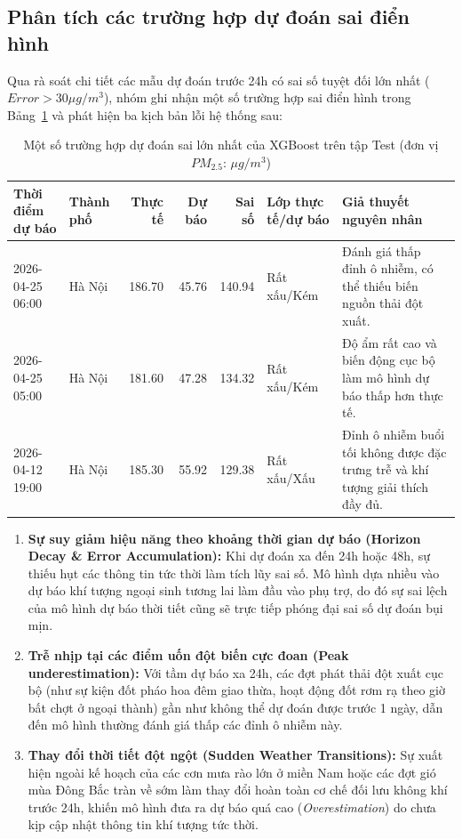 \documentclass[12pt,a4paper]{article}
\begin{document}
\subsection{Phân tích các trường hợp dự đoán sai điển hình}

Qua rà soát chi tiết các mẫu dự đoán trước 24h có sai số tuyệt đối lớn nhất ($Error > 30 \mu g/m^3$), nhóm ghi nhận một số trường hợp sai điển hình trong Bảng~\ref{tab:error-cases} và phát hiện ba kịch bản lỗi hệ thống sau:

\begin{table}[H]
    \centering
    \scriptsize
    \caption{Một số trường hợp dự đoán sai lớn nhất của XGBoost trên tập Test (đơn vị $PM_{2.5}$: $\mu g/m^3$)}
    \label{tab:error-cases}
    \begin{tabular}{p{2.4cm}p{1.3cm}rrrp{2.0cm}p{4.2cm}}
        \toprule
        \textbf{Thời điểm dự báo} & \textbf{Thành phố} & \textbf{Thực tế} & \textbf{Dự báo} & \textbf{Sai số} & \textbf{Lớp thực tế/dự báo} & \textbf{Giả thuyết nguyên nhân} \\
        \midrule
        2026-04-25 06:00 & Hà Nội & 186.70 & 45.76 & 140.94 & Rất xấu/Kém & Đánh giá thấp đỉnh ô nhiễm, có thể thiếu biến nguồn thải đột xuất. \\
        2026-04-25 05:00 & Hà Nội & 181.60 & 47.28 & 134.32 & Rất xấu/Kém & Độ ẩm rất cao và biến động cục bộ làm mô hình dự báo thấp hơn thực tế. \\
        2026-04-12 19:00 & Hà Nội & 185.30 & 55.92 & 129.38 & Rất xấu/Xấu & Đỉnh ô nhiễm buổi tối không được đặc trưng trễ và khí tượng giải thích đầy đủ. \\
        \bottomrule
    \end{tabular}
\end{table}

\begin{enumerate}
    \item \textbf{Sự suy giảm hiệu năng theo khoảng thời gian dự báo (Horizon Decay \& Error Accumulation):} Khi dự đoán xa đến 24h hoặc 48h, sự thiếu hụt các thông tin tức thời làm tích lũy sai số. Mô hình dựa nhiều vào dự báo khí tượng ngoại sinh tương lai làm đầu vào phụ trợ, do đó sự sai lệch của mô hình dự báo thời tiết cũng sẽ trực tiếp phóng đại sai số dự đoán bụi mịn.
    \item \textbf{Trễ nhịp tại các điểm uốn đột biến cực đoan (Peak underestimation):} Với tầm dự báo xa 24h, các đợt phát thải đột xuất cục bộ (như sự kiện đốt pháo hoa đêm giao thừa, hoạt động đốt rơm rạ theo giờ bất chợt ở ngoại thành) gần như không thể dự đoán được trước 1 ngày, dẫn đến mô hình thường đánh giá thấp các đỉnh ô nhiễm này.
    \item \textbf{Thay đổi thời tiết đột ngột (Sudden Weather Transitions):} Sự xuất hiện ngoài kế hoạch của các cơn mưa rào lớn ở miền Nam hoặc các đợt gió mùa Đông Bắc tràn về sớm làm thay đổi hoàn toàn cơ chế đối lưu không khí trước 24h, khiến mô hình đưa ra dự báo quá cao (\textit{Overestimation}) do chưa kịp cập nhật thông tin khí tượng tức thời.
\end{enumerate}
\end{document}
